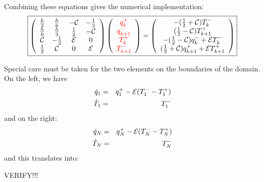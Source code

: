 Combining these equations gives the numerical implementation:
\begin{eqnarray}
\boxed{
\left(
\begin{array}{cccc}
\frac{h}{3}    &  \frac{h}{6} & -{\cal C}   &-\frac{1}{2} \\
\frac{h}{6}    &  \frac{h}{3} & \frac{1}{2} & -{\cal C} \\
{\cal C}    & -\frac{1}{2} & {\cal E} & 0\\
\frac{1}{2} & {\cal C} & 0 & {\cal E}
\end{array}
\right) \left(
\begin{array}{c}
     \color{red}{q_k^+}  \\
     \color{red}{q_{k+1}^-} \\
     \color{red}{T_k^+} \\
     \color{red}{T_{k+1}^-}
\end{array}
\right)=\left(
\begin{array}{c}
     -(\frac{1}{2}+{\cal{C}}) T_k^-  \\
      (\frac{1}{2}-{\cal{C}}) T_{k+1}^+ \\
     -(\frac{1}{2}-{\cal{C}})q_k^-+{\cal{E}} T_k^-  \\
      (\frac{1}{2}+{\cal{C}})q_{k+1}^++{\cal{E}} T_{k+1}^+
\end{array}
\right)
}
\end{eqnarray}

Special care must be taken for the two elements on the boundaries of the domain. 
On the left, we have 
\begin{eqnarray}
\hat{q}_1 &=& q_1^+ -{\cal E} (T_1^--T_1^+) \nonumber  \\
\hat{T}_1 &=& T_1^- \nonumber
\end{eqnarray}
and on the right:
\begin{eqnarray}
\hat{q}_N &=& q_N^+ -{\cal E} (T_N^--T_N^+) \nonumber  \\
\hat{T}_N &=& T_N^- \nonumber
\end{eqnarray}
and this translates into:

VERIFY!!!

